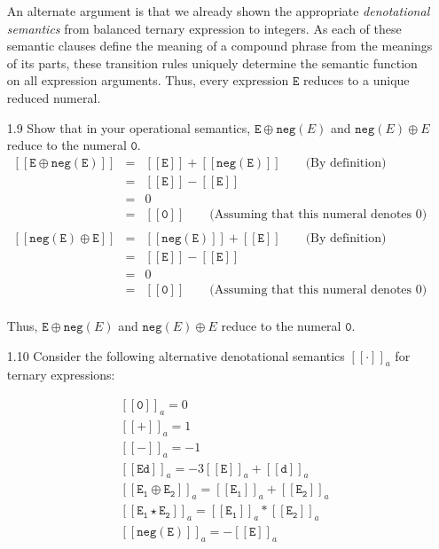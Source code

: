 \documentclass[a4paper,10pt]{article}
\newcommand{\E}{\mathtt{E}}
\newcommand{\digit}{\mathtt{d}}
\newcommand{\negation}{\mathtt{neg}}
\newcommand{\denot}[1]{\mathtt{[[{#1}]]}}
\newcommand{\question}[1]
{\color{DarkBlue}#1 \color{Black} \newline}
\begin{document}
\begin{enumerate}
An alternate argument is that we already shown the
appropriate \textit{denotational semantics} from balanced ternary expression to
integers. As each of these semantic clauses define the meaning of a compound
phrase from the meanings of its parts, these transition rules uniquely 
determine the semantic function on all expression arguments. 
Thus, every expression $\E$ reduces to a unique reduced numeral.

\question{
\item[1.9] Show that in your operational semantics, $\E \oplus \negation(E)$ and 
$\negation(E) \oplus E$ reduce to the numeral $\mathtt{0}$.
}
\begin{eqnarray*}
\denot{E \oplus \negation(E)}
	& = & \denot{E} + \denot{\negation(E)} \qquad \text{(By definition)} \\
	& = & \denot{E} - \denot{E} \\
	& = & 0	\\
	& = & \denot{\mathtt{0}} \qquad \text{(Assuming that this numeral denotes 0)}\\
\end{eqnarray*}
\begin{eqnarray*}
\denot{\negation(E) \oplus E} 
	& = & \denot{\negation(E)} + \denot{E}  \qquad \text{(By definition)} \\
	& = & \denot{E} - \denot{E} \\
	& = & 0	\\
	& = & \denot{\mathtt{0}}	\qquad \text{(Assuming that this numeral denotes 0)}\\
\end{eqnarray*}

Thus, $\E \oplus \negation(E)$ and $\negation(E) \oplus E$ reduce to the 
numeral $\mathtt{0}$.

\question{
\item[1.10] Consider the following alternative denotational semantics $\denot{\cdot}_a$ for ternary expressions:

\begin{align*}
& \denot{\mathtt{0}}_a = 0 \\ & \denot{\mathtt{+}}_a = 1 \\ & \denot{\mathtt{-}}_a = -1 \\
& \denot{\E \digit}_a = -3\denot{E}_a + \denot{\digit}_a \\
& \denot{\E_1 \oplus \E_2}_a = \denot{\E_1}_a + \denot{\E_2}_a \\
& \denot{\E_1 \star \E_2}_a = \denot{\E_1}_a * \denot{\E_2}_a \\
& \denot{\negation(\E)}_a = -\denot{\E}_a
\end{align*}

}
\end{enumerate}
\end{document}
